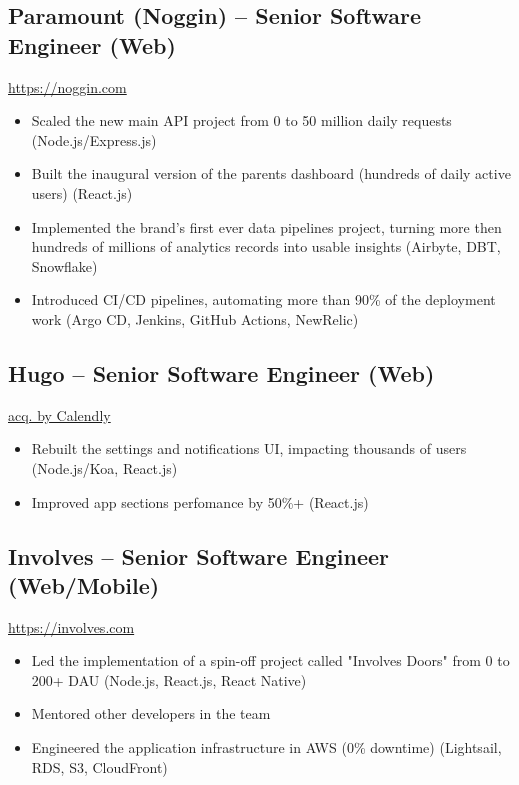 \documentclass[11pt, a4paper]{article}
\begin{document}
\subsection*{Paramount (Noggin) -- Senior Software Engineer (Web)}
\href{https://www.noggin.com}{https://noggin.com}
\begin{itemize}[noitemsep]
    \item Scaled the new main API project from 0 to 50 million daily requests (Node.js/Express.js)
    \item Built the inaugural version of the parents dashboard (hundreds of daily active users) (React.js)
    \item Implemented the brand's first ever data pipelines project, turning more then hundreds of millions of analytics records into usable insights (Airbyte, DBT, Snowflake)
    \item Introduced CI/CD pipelines, automating more than 90\% of the deployment work (Argo CD, Jenkins, GitHub Actions, NewRelic)
\end{itemize}

\subsection*{Hugo -- Senior Software Engineer (Web)}
\href{https://www.linkedin.com/company/hugo-team/}{acq. by Calendly}
\begin{itemize}[noitemsep]
    \item Rebuilt the settings and notifications UI, impacting thousands of users (Node.js/Koa, React.js)
    \item Improved app sections perfomance by 50\%+ (React.js)
\end{itemize}

\subsection*{Involves -- Senior Software Engineer (Web/Mobile)}
\href{https://involves.com/}{https://involves.com}
\begin{itemize}[noitemsep]
    \item Led the implementation of a spin-off project called "Involves Doors" from 0 to 200+ DAU (Node.js, React.js, React Native)
    \item Mentored other developers in the team
    \item Engineered the application infrastructure in AWS (0\% downtime) (Lightsail, RDS, S3, CloudFront)
\end{itemize}
\end{document}
